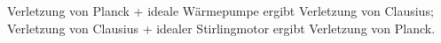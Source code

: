 Verletzung von Planck + ideale Wärmepumpe ergibt Verletzung von Clausius; Verletzung von Clausius + idealer Stirlingmotor ergibt Verletzung von Planck.
